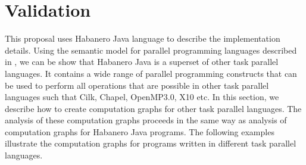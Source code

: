 \section{Validation}

This proposal uses Habanero Java language to describe the implementation details. Using the semantic model for parallel programming languages described in \cite{bouajjani2012analysis}, we can be show that Habanero Java is a superset of other task parallel languages. It contains a wide range of parallel programming constructs that can be used to perform all operations that are possible in other task parallel languages such that Cilk, Chapel, OpenMP3.0, X10 etc. In this section, we describe how to create computation graphs for other task parallel languages. The analysis of these computation graphs proceeds in the same way as analysis of computation graphs for Habanero Java programs. The following examples illustrate the computation graphs for programs written in different task parallel languages.


